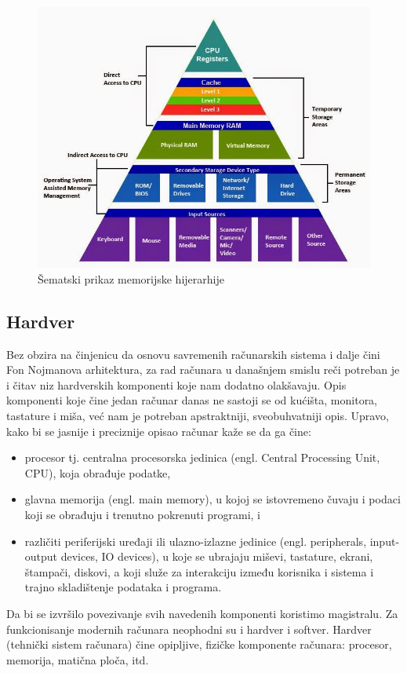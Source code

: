 \documentclass[a4paper]{article}
\begin{document}
{\begin{figure}[h!]
\begin{center}
\includegraphics[scale=0.25]{pictures/mem_hijer.jpg}
\end{center}
\caption{Šematski prikaz memorijske hijerarhije}
\label{fig:memh}
\end{figure}

\subsection{Hardver}
Bez obzira na činjenicu da osnovu savremenih računarskih sistema i dalje čini Fon Nojmanova arhitektura, za rad računara u današnjem smislu reči potreban je i čitav niz hardverskih komponenti koje nam dodatno olakšavaju. Opis komponenti koje čine jedan računar danas ne sastoji se od kućišta, monitora, tastature i miša, već nam je potreban apstraktniji, sveobuhvatniji opis. Upravo, kako bi se jasnije i preciznije opisao računar kaže se da ga čine:
\begin{itemize}
\item procesor tj. centralna procesorska jedinica (engl. Central Processing Unit,
CPU), koja obrađuje podatke,
\item glavna memorija (engl. main memory), u kojoj se istovremeno čuvaju i
podaci koji se obrađuju i trenutno pokrenuti programi, i 
\item različiti periferijski uređaji ili ulazno-izlazne jedinice (engl. peripherals,
input-output devices, IO devices), u koje se ubrajaju miševi, tastature, ekrani,
štampači, diskovi, a koji služe za interakciju između korisnika i sistema i trajno skladištenje podataka i programa.
\end{itemize} 
Da bi se izvršilo povezivanje svih navedenih komponenti koristimo magistralu.
Za funkcionisanje modernih računara neophodni su i hardver i softver. 
Hardver (tehnički sistem računara) čine opipljive, fizičke komponente računara: procesor, memorija, matična ploča, itd. 

}
\end{document}
